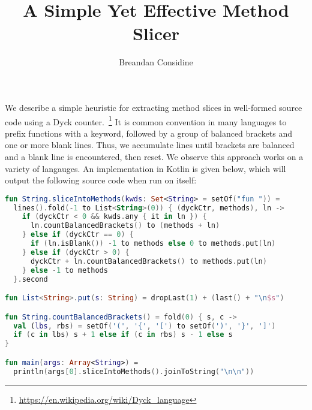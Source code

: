\documentclass[12pt]{article}
\title{A Simple Yet Effective Method Slicer}
\author{Breandan Considine}
\begin{document}
  \maketitle
We describe a simple heuristic for extracting method slices in well-formed source code using a Dyck counter.~\footnote{\url{https://en.wikipedia.org/wiki/Dyck\_language}} It is common convention in many languages to prefix functions with a keyword, followed by a group of balanced brackets and one or more blank lines. Thus, we accumulate lines until brackets are balanced and a blank line is encountered, then reset. We observe this approach works on a variety of langauges. An implementation in Kotlin is given below, which will output the following source code when run on itself:

  \vspace{11pt}

  \begin{lstlisting}[basicstyle=\footnotesize\ttfamily, language=kotlin,label={lst:lstlisting}]
fun String.sliceIntoMethods(kwds: Set<String> = setOf("fun ")) =
  lines().fold(-1 to List<String>(0)) { (dyckCtr, methods), ln ->
    if (dyckCtr < 0 && kwds.any { it in ln }) {
      ln.countBalancedBrackets() to (methods + ln)
    } else if (dyckCtr == 0) {
      if (ln.isBlank()) -1 to methods else 0 to methods.put(ln)
    } else if (dyckCtr > 0) {
      dyckCtr + ln.countBalancedBrackets() to methods.put(ln)
    } else -1 to methods
  }.second

fun List<String>.put(s: String) = dropLast(1) + (last() + "\n$s")

fun String.countBalancedBrackets() = fold(0) { s, c ->
  val (lbs, rbs) = setOf('(', '{', '[') to setOf(')', '}', ']')
  if (c in lbs) s + 1 else if (c in rbs) s - 1 else s
}

fun main(args: Array<String>) =
  println(args[0].sliceIntoMethods().joinToString("\n\n"))
  \end{lstlisting}
\end{document}
